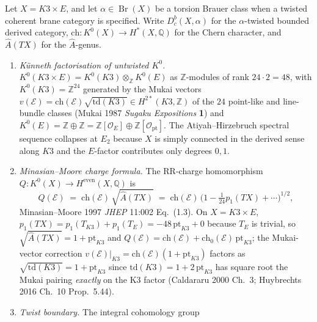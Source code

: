 \begin{proposition}
\label{prop:k3e-cy3-witten-moore-dbrane-ktheory}
Let \(X=K3\times E\), and let \(\alpha\in
\operatorname{Br}(X)\) be a torsion Brauer class when a twisted coherent
brane category is specified. Write \(D^b_c(X,\alpha)\) for the
\(\alpha\)-twisted bounded derived category, \(\mathrm{ch}\colon
K^0(X)\to H^*(X,\mathbb Q)\) for the Chern character, and
\(\hat A(TX)\) for the \(\hat A\)-genus.
\begin{enumerate}[label=\textup{(\roman*)}]
\item \emph{K\"unneth factorisation of untwisted $K^{0}$.} $K^{0}(K3\times E) = K^{0}(K3)\otimes_{\mathbb Z} K^{0}(E)$ as $\mathbb Z$-modules of rank $24\cdot 2 = 48$, with $K^{0}(K3) = \mathbb Z^{24}$ generated by the Mukai vectors $v(\mathcal E) = \mathrm{ch}(\mathcal E)\sqrt{\mathrm{td}(K3)} \in H^{2*}(K3,\mathbb Z)$ of the $24$ point-like and line-bundle classes (Mukai 1987 \emph{Sugaku Expositions} \textbf{1}) and $K^{0}(E) = \mathbb Z\oplus\mathbb Z = \mathbb Z[\mathcal O_{E}]\oplus\mathbb Z[\mathcal O_{\mathrm{pt}}]$. The Atiyah--Hirzebruch spectral sequence collapses at $E_{2}$ because $X$ is simply connected in the derived sense along $K3$ and the $E$-factor contributes only degrees $0, 1$.
\item \emph{Minasian--Moore charge formula.} The RR-charge homomorphism $Q\colon K^{0}(X)\to H^{\mathrm{even}}(X,\mathbb Q)$ is
\[
 Q(\mathcal E) \;=\; \mathrm{ch}(\mathcal E)\,\sqrt{\hat A(TX)} \;=\; \mathrm{ch}(\mathcal E)\,\bigl(1 - \tfrac{1}{24} p_{1}(TX) + \cdots\bigr)^{1/2},
\]
Minasian--Moore 1997 \emph{JHEP} 11:002 Eq.~(1.3). On $X = K3\times E$, $p_{1}(TX) = p_{1}(T_{K3}) + p_{1}(T_{E}) = -48\,\mathrm{pt}_{K3} + 0$ because $T_{E}$ is trivial, so $\sqrt{\hat A(TX)} = 1 + \mathrm{pt}_{K3}$ and $Q(\mathcal E) = \mathrm{ch}(\mathcal E) + \mathrm{ch}_{0}(\mathcal E)\,\mathrm{pt}_{K3}$; the Mukai-vector correction $v(\mathcal E)|_{K3} = \mathrm{ch}(\mathcal E)(1 + \mathrm{pt}_{K3})$ factors as $\sqrt{\mathrm{td}(K3)} = 1 + \mathrm{pt}_{K3}$ since $\mathrm{td}(K3) = 1 + 2\,\mathrm{pt}_{K3}$ has square root the Mukai pairing \emph{exactly} on the K3 factor (Caldararu 2000 Ch.~3; Huybrechts 2016 Ch.~10 Prop.~5.44).
\item \emph{Twist boundary.} The integral cohomology group

\end{enumerate}
\end{proposition}
